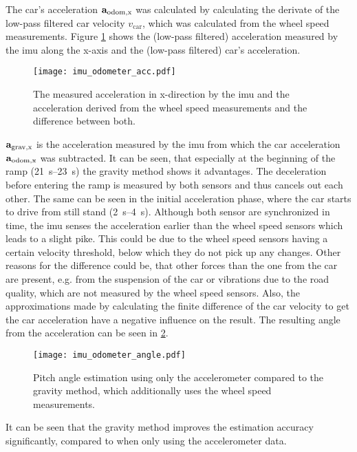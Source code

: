 The car's acceleration $\vb{a}_\mathrm{odom,x} $ was calculated by calculating the derivate of the low-pass filtered car velocity $v_\mathrm{car} $, which was calculated from the wheel speed measurements.
Figure \ref{fig:imu_odometer_acc} shows the (low-pass filtered) acceleration measured by the \gls{imu} along the x-axis and the (low-pass filtered) car's acceleration.
\begin{figure}[htb]
	\centering
	\texttt{[image: imu\_odometer\_acc.pdf]}
	\caption[Acceleration from \gls{imu} and odometer]{The measured acceleration in x-direction by the \gls{imu} and the acceleration derived from the wheel speed measurements and the difference between both.}
	\label{fig:imu_odometer_acc}
\end{figure}
$\vb{a}_\mathrm{grav,x} $ is the acceleration measured by the \gls{imu} from which the car acceleration $\vb{a}_\mathrm{odom,x} $ was subtracted.
It can be seen, that especially at the beginning of the ramp (\SIrange{21}{23}{\second}) the gravity method shows it advantages.
The deceleration before entering the ramp is measured by both sensors and thus cancels out each other.
The same can be seen in the initial acceleration phase, where the car starts to drive from still stand (\SIrange[]{2}{4}{\second}).
Although both sensor are synchronized in time, the \gls{imu} senses the acceleration earlier than the wheel speed sensors which leads to a slight pike.
This could be due to the wheel speed sensors having a certain velocity threshold, below which they do not pick up any changes.
Other reasons for the difference could be, that other forces than the one from the car are present, e.g. from the suspension of the car or vibrations due to the road quality, which are not measured by the wheel speed sensors.
Also, the approximations made by calculating the finite difference of the car velocity to get the car acceleration have a negative influence on the result.
The resulting angle from the acceleration can be seen in \cref{fig:imu_odometer_angle}.
\begin{figure}[htbp]
	\centering
	\texttt{[image: imu\_odometer\_angle.pdf]}
	\caption[Angle estimation using the gravity method]{Pitch angle estimation using only the accelerometer compared to the gravity method, which additionally uses the wheel speed measurements.}
	\label{fig:imu_odometer_angle}
\end{figure}
It can be seen that the gravity method improves the estimation accuracy significantly, compared to when only using the accelerometer data.
